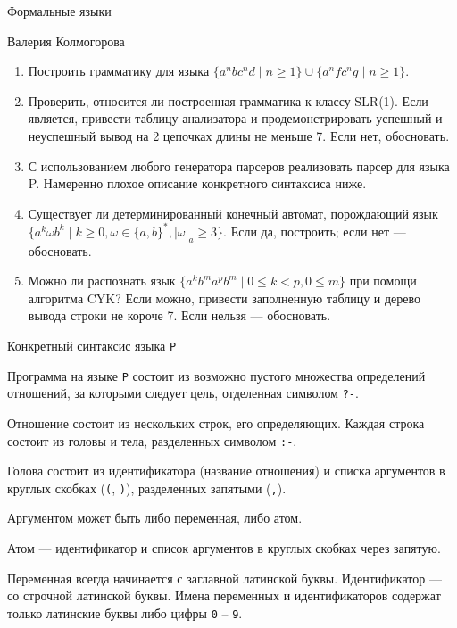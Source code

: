 \documentclass[12pt]{article}
\begin{document}
\begin{center}
{\LARGE Формальные языки}

\bigskip

{\Large Валерия Колмогорова}
\end{center} 

\bigskip

\begin{enumerate}
  \item Построить грамматику для языка $\{ a^n b c^n d \mid n \geq 1 \} \cup \{ a^n f c^n g \mid n \geq 1 \}$.
  \item Проверить, относится ли построенная грамматика к классу SLR(1). Если является, привести таблицу анализатора и продемонстрировать успешный и неуспешный вывод на 2 цепочках длины не меньше 7. Если нет, обосновать.
  \item С использованием любого генератора парсеров реализовать парсер для языка P. Намеренно плохое описание конкретного синтаксиса ниже.
  \item Существует ли детерминированный конечный автомат, порождающий язык $\{a^k \omega b^k \mid k \geq 0, \omega \in \{a, b\}^*, |\omega|_a \geq 3 \}$. Если да, построить; если нет --- обосновать.
  \item Можно ли распознать язык $\{a^k b^m a^p b^m \mid 0 \leq k < p, 0 \leq m\}$ при помощи алгоритма CYK? Если можно, привести заполненную таблицу и дерево вывода строки не короче 7. Если нельзя --- обосновать.
\end{enumerate}

\begin{center}
    \Large{Конкретный синтаксис языка \verb!P!}
\end{center}

Программа на языке \verb!P! состоит из возможно пустого множества определений отношений, за которыми следует цель, отделенная символом \verb!?-!.

Отношение состоит из нескольких строк, его определяющих. 
Каждая строка состоит из головы и тела, разделенных символом \verb!:-!. 

Голова состоит из идентификатора (название отношения) и списка аргументов в круглых скобках (\verb!(!, \verb!)!), разделенных запятыми (\verb!,!). 

Аргументом может быть либо переменная, либо атом. 

Атом --- идентификатор и список аргументов в круглых скобках через запятую. 

Переменная всегда начинается с заглавной латинской буквы. Идентификатор --- со строчной латинской буквы.
Имена переменных и идентификаторов содержат только латинские буквы либо цифры \verb!0! -- \verb!9!.
\end{document}
